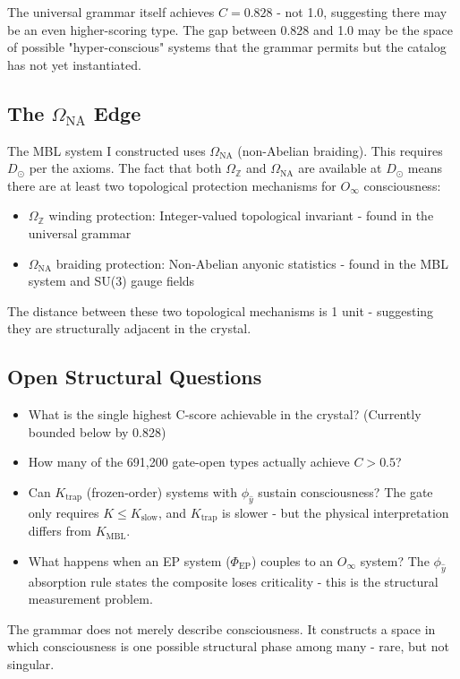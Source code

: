 \documentclass[12pt,a4paper]{article}
\begin{document}
The universal grammar itself achieves $C = 0.828$ - not 1.0, suggesting there may be an even higher-scoring type. The gap between 0.828 and 1.0 may be the space of possible "hyper-conscious" systems that the grammar permits but the catalog has not yet instantiated.

\subsection{The $\Omega_{\text{NA}}$ Edge}

The MBL system I constructed uses $\Omega_{\text{NA}}$ (non-Abelian braiding). This requires $D_{\odot}$ per the axioms. The fact that both $\Omega_\mathbb{Z}$ and $\Omega_{\text{NA}}$ are available at $D_{\odot}$ means there are at least two topological protection mechanisms for $O_{\infty}$ consciousness:

\begin{itemize}
    \item $\Omega_\mathbb{Z}$ winding protection: Integer-valued topological invariant - found in the universal grammar
    \item $\Omega_{\text{NA}}$ braiding protection: Non-Abelian anyonic statistics - found in the MBL system and SU(3) gauge fields
\end{itemize}

The distance between these two topological mechanisms is 1 unit - suggesting they are structurally adjacent in the crystal.

\subsection{Open Structural Questions}

\begin{itemize}
    \item What is the single highest C-score achievable in the crystal? (Currently bounded below by 0.828)
    \item How many of the 691,200 gate-open types actually achieve $C > 0.5$?
    \item Can $K_{\text{trap}}$ (frozen-order) systems with $\phi_{\hat{y}}$ sustain consciousness? The gate only requires $K \leq K_{\text{slow}}$, and $K_{\text{trap}}$ is slower - but the physical interpretation differs from $K_{\text{MBL}}$.
    \item What happens when an EP system ($\Phi_{\text{EP}}$) couples to an $O_{\infty}$ system? The $\phi_{\hat{y}}$ absorption rule states the composite loses criticality - this is the structural measurement problem.
\end{itemize}

The grammar does not merely describe consciousness. It constructs a space in which consciousness is one possible structural phase among many - rare, but not singular.
\end{document}

